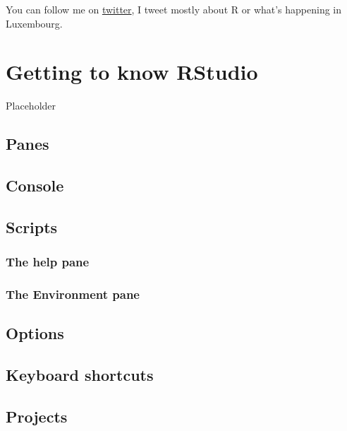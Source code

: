\documentclass[]{gitbook}
\begin{document}
You can follow me on \href{https://www.twitter.com/brodriguesco}{twitter}, I tweet mostly about R or
what's happening in Luxembourg.

\hypertarget{getting-to-know-rstudio}{%
\section{Getting to know RStudio}\label{getting-to-know-rstudio}}

Placeholder

\hypertarget{panes}{%
\subsection{Panes}\label{panes}}

\hypertarget{console}{%
\subsection{Console}\label{console}}

\hypertarget{scripts}{%
\subsection{Scripts}\label{scripts}}

\hypertarget{the-help-pane}{%
\subsubsection{The help pane}\label{the-help-pane}}

\hypertarget{the-environment-pane}{%
\subsubsection{The Environment pane}\label{the-environment-pane}}

\hypertarget{options}{%
\subsection{Options}\label{options}}

\hypertarget{keyboard-shortcuts}{%
\subsection{Keyboard shortcuts}\label{keyboard-shortcuts}}

\hypertarget{projects}{%
\subsection{Projects}\label{projects}}
\end{document}
